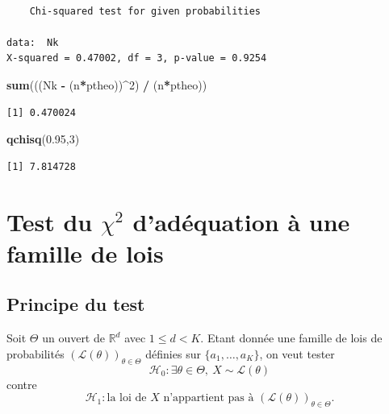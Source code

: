 \documentclass[
]{book}
\newenvironment{Shaded}{\begin{snugshade}}{\end{snugshade}}
\newcommand{\DecValTok}[1]{\textcolor[rgb]{0.00,0.00,0.81}{#1}}
\newcommand{\FloatTok}[1]{\textcolor[rgb]{0.00,0.00,0.81}{#1}}
\newcommand{\KeywordTok}[1]{\textcolor[rgb]{0.13,0.29,0.53}{\textbf{#1}}}
\newcommand{\NormalTok}[1]{#1}
\newcommand{\OperatorTok}[1]{\textcolor[rgb]{0.81,0.36,0.00}{\textbf{#1}}}
\newcommand{\StringTok}[1]{\textcolor[rgb]{0.31,0.60,0.02}{#1}}
\theoremstyle{definition}
\theoremstyle{definition}
\theoremstyle{definition}
\theoremstyle{definition}
\theoremstyle{remark}
\begin{document}
\begin{verbatim}

    Chi-squared test for given probabilities

data:  Nk
X-squared = 0.47002, df = 3, p-value = 0.9254
\end{verbatim}

\begin{Shaded}
\begin{Highlighting}[]
\KeywordTok{sum}\NormalTok{(((Nk }\OperatorTok{-}\StringTok{ }\NormalTok{(n}\OperatorTok{*}\NormalTok{ptheo))}\OperatorTok{^}\DecValTok{2}\NormalTok{) }\OperatorTok{/}\StringTok{ }\NormalTok{(n}\OperatorTok{*}\NormalTok{ptheo)) }
\end{Highlighting}
\end{Shaded}

\begin{verbatim}
[1] 0.470024
\end{verbatim}

\begin{Shaded}
\begin{Highlighting}[]
\KeywordTok{qchisq}\NormalTok{(}\FloatTok{0.95}\NormalTok{,}\DecValTok{3}\NormalTok{)}
\end{Highlighting}
\end{Shaded}

\begin{verbatim}
[1] 7.814728
\end{verbatim}

\hypertarget{test-du-chi2-daduxe9quation-uxe0-une-famille-de-lois}{%
\section{\texorpdfstring{Test du \(\chi^2\) d'adéquation à une famille de lois}{Test du \textbackslash chi\^{}2 d'adéquation à une famille de lois}}\label{test-du-chi2-daduxe9quation-uxe0-une-famille-de-lois}}

\hypertarget{principe-du-test}{%
\subsection{Principe du test}\label{principe-du-test}}

Soit \(\Theta\) un ouvert de \(\mathbb{R}^d\) avec \(1\leq d<K\).
Etant donnée une famille de lois de probabilités \((\mathcal L(\theta))_{\theta\in\Theta}\) définies sur \(\{a_1,\ldots,a_K\}\), on veut tester
\[
\mathcal{H}_0 : \exists \theta\in\Theta,\ X\sim \mathcal L(\theta)
\]
contre
\[
\mathcal{H}_1 : \textrm{la loi de } X \textrm{ n'appartient pas à } (\mathcal L(\theta))_{\theta\in\Theta}.
\]
\end{document}
